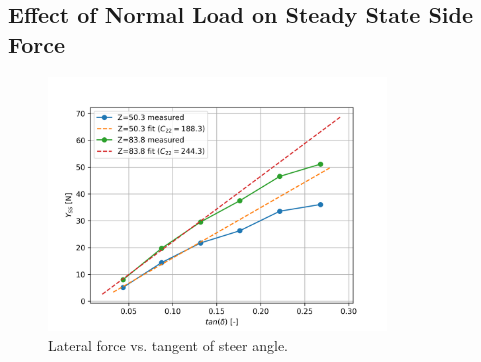 \documentclass{article}
\begin{document}
\subsection{\textbf{Effect of Normal Load on Steady State Side Force}}

\begin{figure}[H]
    \centering
    \includegraphics[width=0.8\textwidth]{4.3/Yss_vs_tandelta.png}
    \caption{Lateral force vs. tangent of steer angle.}
    \label{fig:Y_vs_alpha}
\end{figure}
\end{document}
